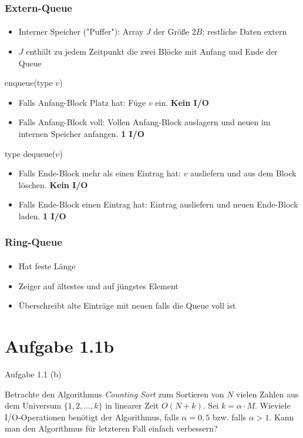 \documentclass[handout]{beamer}
\begin{document}
\begin{frame}
  \frametitle{Extern-Queue}
  \framesubtitle{}
  \begin{itemize}[<+->]
    \item Interner Speicher ("Puffer"): Array $J$ der Größe $2B$; restliche Daten extern
    \item $J$ enthält zu jedem Zeitpunkt die zwei Blöcke mit Anfang und Ende der Queue
  \end{itemize}

  enqueue(type $v$)
  \begin{itemize}[<+->]
    \item Falls Anfang-Block Platz hat: Füge $v$ ein. \bf{Kein I/O}
    \item Falls Anfang-Block voll: Vollen Anfang-Block auslagern und neuen im internen Speicher anfangen. \bf{1 I/O}
  \end{itemize}

  type dequeue($v$)
  \begin{itemize}[<+->]
    \item Falls Ende-Block mehr als einen Eintrag hat: $v$ ausliefern und aus dem Block löschen. \bf{Kein I/O}
    \item Falls Ende-Block einen Eintrag hat: Eintrag ausliefern und neuen Ende-Block laden. \bf{1 I/O}
  \end{itemize}
\end{frame}

\begin{frame}
  \frametitle{Ring-Queue}
  \framesubtitle{}
  \begin{itemize}
    \item Hat feste Länge
    \item Zeiger auf ältestes und auf jüngstes Element
    \item Überschreibt alte Einträge mit neuen falls die Queue voll ist
  \end{itemize}
\end{frame}

\section{Aufgabe 1.1b}
\begin{frame}{Aufgabe 1.1 (b)}

  Betrachte den Algorithmus \emph{Counting Sort} zum Sortieren von $N$ vielen Zahlen aus dem Universum $\{1,2,\dots{},k\}$ in linearer Zeit $O(N+k)$. 
  Sei $k = \alpha \cdot M$.
  Wieviele I/O-Operationen benötigt der Algorithmus, falls $\alpha = 0,5$ bzw. falls $\alpha > 1$.
  Kann man den Algorithmus für letzteren Fall einfach verbessern?
\end{frame}
\end{document}
